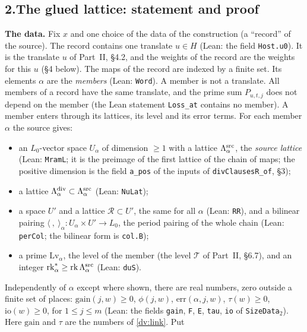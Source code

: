 \documentclass[11pt,letterpaper]{article}
\begin{document}
\subsection*{2.\quad The glued lattice: statement and proof}

\textbf{The data.} Fix $x$ and one choice of the data of the construction (a ``record'' of the source).
The record contains one translate $u\in H$ (Lean: the field \texttt{Host.u0}). It is the translate $u$ of
Part~II, \S4.2, and the weights of the record are the weights for this $u$ (\S4 below). The maps of the
record are indexed by a finite set. Its elements $\alpha$ are the \emph{members} (Lean: \texttt{Word}). A
member is not a translate. All members of a record have the same translate, and the prime sum $P_{u,t,j}$
does not depend on the member (the Lean statement \texttt{Loss\_at} contains no member). A member enters
through its lattices, its level and its error terms. For each member $\alpha$ the source gives:
\begin{itemize}[leftmargin=1.6em,itemsep=1pt,topsep=2pt]
\item an $L_0$-vector space $U_\alpha$ of dimension $\ge1$ with a lattice $\Lambda^{\rm src}_\alpha$, the
\emph{source lattice} (Lean: \texttt{MramL}; it is the preimage of the first lattice of the chain of maps;
the positive dimension is the field \texttt{a\_pos} of the inputs of \texttt{divClausesR\_of}, \S3);
\item a lattice $\Lambda^{\rm div}_\alpha\subset\Lambda^{\rm src}_\alpha$ (Lean: \texttt{NuLat});
\item a space $U'$ and a lattice $\mathcal R\subset U'$, the same for all $\alpha$ (Lean: \texttt{RR}), and
a bilinear pairing $\langle\ ,\ \rangle_\alpha:U_\alpha\times U'\to L_0$, the period pairing of the whole
chain (Lean: \texttt{perCol}; the bilinear form is \texttt{col.B});
\item a prime $\mathrm{Lv}_\alpha$, the level of the member (the level $\mathcal T$ of Part~II, \S6.7), and
an integer $\mathrm{rk}^*_\alpha\ge\mathrm{rk}\,\Lambda^{\rm src}_\alpha$ (Lean: \texttt{duS}).
\end{itemize}
Independently of $\alpha$ except where shown, there are real numbers, zero outside a finite set of places:
$\mathrm{gain}(j,w)\ge0$, $\phi(j,w)$, $\mathrm{err}(\alpha,j,w)$, $\tau(w)\ge0$, $\mathrm{io}(w)\ge0$, for
$1\le j\le m$ (Lean: the fields \texttt{gain}, \texttt{F}, \texttt{E}, \texttt{tau}, \texttt{io} of
\texttt{SizeData}$_2$). Here $\mathrm{gain}$ and $\tau$ are the numbers of \eqref{dv:link}. Put
\end{document}
